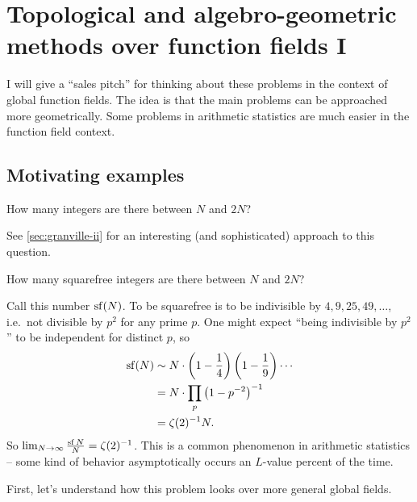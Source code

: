 
\section{Topological and algebro-geometric methods over function fields I}\label{sec:ellenberg-i}





I will give a ``sales pitch'' for thinking about these problems in the context 
of global function fields. The idea is that the main problems can be approached 
more geometrically. Some problems in arithmetic statistics are much easier in 
the function field context. 





\subsection{Motivating examples}

\begin{question}
How many integers are there between $N$ and $2 N$?
\end{question}

See \autoref{sec:granville-ii} for an interesting (and sophisticated) approach 
to this question. 

\begin{question}
How many squarefree integers are there between $N$ and $2 N$?
\end{question}

Call this number $\operatorname{sf}(N)$. To be squarefree is to be indivisible by 
$4,9,25,49,\ldots$, i.e.~not divisible by $p^2$ for any prime $p$. One might 
expect ``being indivisible by $p^2$'' to be independent for distinct $p$, so 
\begin{align*}
  \operatorname{sf}(N) 
    &\sim N\cdot\left(1-\frac 1 4\right)\left(1-\frac 1 9\right) \cdots \\
    &= N\cdot \prod_p \left(1-p^{-2}\right)^{-1} \\
    &= \zeta(2)^{-1} N .
\end{align*}
So $\lim_{N\to \infty}\frac{\operatorname{sf}{N}}{N} = \zeta(2)^{-1}$. This is a 
common phenomenon in arithmetic statistics -- some kind of behavior 
asymptotically occurs an $L$-value percent of the time. 

First, let's understand how this problem looks over more general global fields. 


